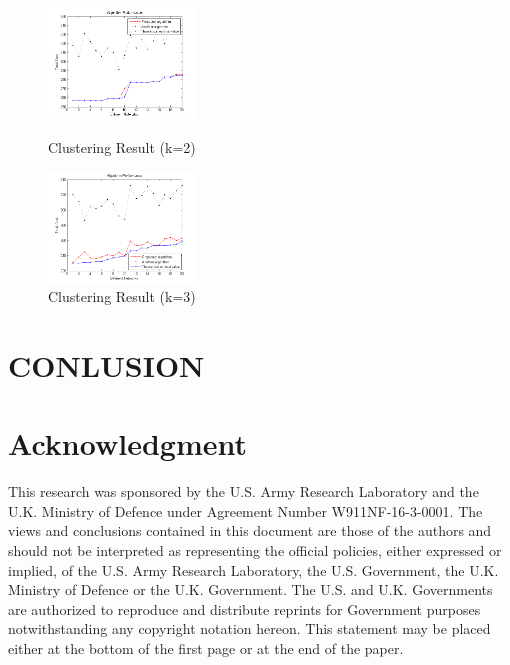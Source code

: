 \documentclass[conference]{IEEEtran}
\begin{document}
\begin{figure}[htbp]
  \centering
  \includegraphics[width=0.35\textwidth]{figures/k2}
  \caption{Clustering Result (k=2)}\label{fig:k2}
  \includegraphics[width=0.35\textwidth]{figures/k3}
  \caption{Clustering Result (k=3)}\label{fig:k3}
\end{figure}

\section{CONLUSION}

\section*{Acknowledgment}
This research was sponsored by the U.S. Army Research Laboratory and the U.K. Ministry of Defence under Agreement Number W911NF-16-3-0001. The views and conclusions contained in this document are those of the authors and should not be interpreted as representing the official policies, either expressed or implied, of the U.S. Army Research Laboratory, the U.S. Government, the U.K. Ministry of Defence or the U.K. Government. The U.S. and U.K. Governments are authorized to reproduce and distribute reprints for Government purposes notwithstanding any copyright notation hereon. This statement may be placed either at the bottom of the first page or at the end of the paper.

\end{document}
